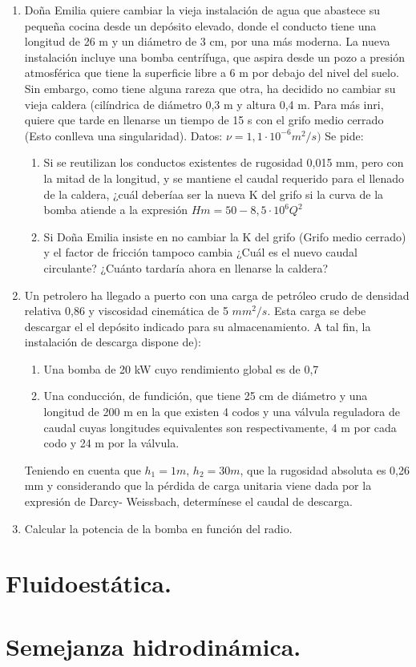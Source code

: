 \begin{enumerate}
	
	\item Doña Emilia quiere cambiar la vieja instalación de agua que abastece su pequeña cocina
	desde un depósito elevado, donde el conducto tiene una longitud de 26 m y un diámetro
	de 3 cm, por una más moderna. La nueva instalación incluye una bomba centrífuga, que
	aspira desde un pozo a presión atmosférica que tiene la superficie libre a 6 m por debajo del
	nivel del suelo. Sin embargo, como tiene alguna rareza que otra, ha decidido no cambiar su
	vieja caldera (cilíndrica de diámetro 0,3 m y altura 0,4 m. Para más inri, quiere que tarde
	en llenarse un tiempo de 15 s con el grifo medio cerrado (Esto conlleva una singularidad).  Datos: $\nu = 1, 1 \cdot 10^{-6}m^2/s)$ Se pide:
	\begin{enumerate}
		\item Si se reutilizan los conductos existentes de rugosidad 0,015 mm, pero con la mitad
		de la longitud, y se mantiene el caudal requerido para el llenado de la caldera, ¿cuál
		deberíaa ser la nueva K del grifo si la curva de la bomba atiende a la expresión $Hm = 50 - 8,5 \cdot 10^6Q^2$
		
		\item Si Doña Emilia insiste en no cambiar la K del grifo (Grifo medio cerrado) y el factor de fricción tampoco cambia ¿Cuál es el nuevo caudal circulante? ¿Cuánto tardaría
		ahora en llenarse la caldera?
	\end{enumerate}
	
	\item Un petrolero ha llegado a puerto con una carga de petróleo crudo de densidad relativa 0,86
	y viscosidad cinemática de 5 $mm^2/s$. Esta carga se debe descargar el el depósito indicado
	para su almacenamiento. A tal fin, la instalación de descarga dispone de):
	
	\begin{enumerate}
		\item Una bomba de 20 kW cuyo rendimiento global es de 0,7
		\item Una conducción, de fundición, que tiene 25 cm de diámetro y una longitud de 200
		m en la que existen 4 codos y una válvula reguladora de caudal cuyas longitudes
		equivalentes son respectivamente, 4 m por cada codo y 24 m por la válvula.
	\end{enumerate}
	Teniendo en cuenta que $h_1 = 1 m$, $h_2 = 30 m$, que la rugosidad absoluta es 0,26 mm
	y considerando que la pérdida de carga unitaria viene dada por la expresión de Darcy-
	Weissbach, determínese el caudal de descarga.
	
	
	\item Calcular la potencia de la bomba en función del radio.
\end{enumerate}
\black
\section{Fluidoestática.}
\section{Semejanza hidrodinámica.}